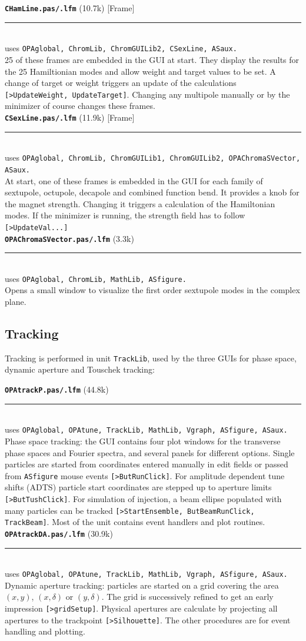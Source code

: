 \documentclass[12pt]{article}
\newcommand\code[1]{{\tt [#1]}}
\newcommand\opamodule[3]{{\bf \tt #1} #2\\  \rule[3pt]{\textwidth}{0.2pt} \\ {\scriptsize uses \tt  #3}\\[1ex]}
\begin{document}
\opamodule{CHamLine.pas/.lfm}{(10.7k) [Frame]}{OPAglobal, ChromLib, ChromGUILib2, CSexLine, ASaux.}
25 of these frames are embedded in the GUI at start. They display the results for the 25 Hamiltionian modes and allow weight and target values to be set. A change of target or weight triggers an update of the calculations \code{>UpdateWeight, UpdateTarget}. Changing any multipole manually or by the minimizer of course changes these frames.\\

\opamodule{CSexLine.pas/.lfm}{(11.9k) [Frame]}{OPAglobal, ChromLib, ChromGUILib1, ChromGUILib2, OPAChromaSVector, ASaux.}
At start, one of these frames is embedded in the GUI for each family of sextupole, octupole, decapole and combined function bend. It provides a knob for the magnet strength. Changing it triggers a calculation of the Hamiltonian modes. If the minimizer is running, the strength field has to follow \code{>UpdateVal...}\\

\opamodule{OPAChromaSVector.pas/.lfm}{(3.3k)}{OPAglobal, ChromLib, MathLib, ASfigure.}
Opens a small window to visualize the first order sextupole modes in the complex plane.


\subsection{Tracking}
Tracking is performed in unit {\tt TrackLib}, used by the three GUIs for phase space, dynamic aperture and Touschek tracking:

\opamodule{OPAtrackP.pas/.lfm}{(44.8k)}{OPAglobal,  OPAtune, TrackLib, MathLib, Vgraph, ASfigure, ASaux.}
Phase space tracking: the GUI contains four plot windows for the transverse phase spaces and Fourier spectra, and several panels for different options. Single particles are started from coordinates entered manually in edit fields or passed from {\tt ASfigure} mouse events \code{>ButRunClick}. For amplitude dependent tune shifts (ADTS) particle start coordinates are stepped up to aperture limits \code{>ButTushClick}. For simulation of injection, a beam ellipse populated with many particles can be tracked \code{>StartEnsemble, ButBeamRunClick, TrackBeam}. Most of the unit contains event handlers and plot routines.\\

\opamodule{OPAtrackDA.pas/.lfm}{(30.9k)}{OPAglobal,  OPAtune, TrackLib, MathLib, Vgraph, ASfigure, ASaux.}
Dynamic aperture tracking: particles are started on a grid covering the area $(x,y)$, $(x,\delta)$ or $(y,\delta)$. The grid is successively refined to get an early impression \code{>gridSetup}. Physical apertures are calculate by projecting all apertures to the trackpoint \code{>Silhouette}. The other procedures are for event handling and plotting.\\
\end{document}
